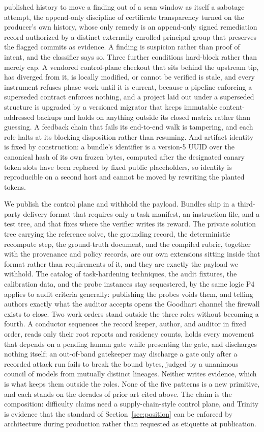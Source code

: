 \documentclass[11pt]{article}
\begin{document}
published history to move a finding out of a scan window as itself a sabotage attempt, the append-only discipline of certificate transparency turned on the producer's own history, whose only remedy is an append-only signed remediation record authorized by a distinct externally enrolled principal group that preserves the flagged commits as evidence. A finding is suspicion rather than proof of intent, and the classifier says so. Three further conditions hard-block rather than merely cap. A vendored control-plane checkout that sits behind the upstream tip, has diverged from it, is locally modified, or cannot be verified is stale, and every instrument refuses phase work until it is current, because a pipeline enforcing a superseded contract enforces nothing, and a project laid out under a superseded structure is upgraded by a versioned migrator that keeps immutable content-addressed backups and holds on anything outside its closed matrix rather than guessing. A feedback chain that fails its end-to-end walk is tampering, and each role halts at its blocking disposition rather than resuming. And artifact identity is fixed by construction: a bundle's identifier is a version-5 UUID over the canonical hash of its own frozen bytes, computed after the designated canary token slots have been replaced by fixed public placeholders, so identity is reproducible on a second host and cannot be moved by rewriting the planted tokens.

We publish the control plane and withhold the payload. Bundles ship in a third-party delivery format that requires only a task manifest, an instruction file, and a test tree, and that fixes where the verifier writes its reward. The private solution tree carrying the reference solve, the grounding record, the deterministic recompute step, the ground-truth document, and the compiled rubric, together with the provenance and policy records, are our own extensions sitting inside that format rather than requirements of it, and they are exactly the payload we withhold. The catalog of task-hardening techniques, the audit fixtures, the calibration data, and the probe instances stay sequestered, by the same logic P4 applies to audit criteria generally: publishing the probes voids them, and telling authors exactly what the auditor accepts opens the Goodhart channel the firewall exists to close. Two work orders stand outside the three roles without becoming a fourth. A conductor sequences the record keeper, author, and auditor in fixed order, reads only their root reports and residency counts, holds every movement that depends on a pending human gate while presenting the gate, and discharges nothing itself; an out-of-band gatekeeper may discharge a gate only after a recorded attack run fails to break the bound bytes, judged by a unanimous council of models from mutually distinct lineages. Neither writes evidence, which is what keeps them outside the roles. None of the five patterns is a new primitive, and each stands on the decades of prior art cited above. The claim is the composition: difficulty claims need a supply-chain-style control plane, and Trinity is evidence that the standard of Section~\ref{sec:position} can be enforced by architecture during production rather than requested as etiquette at publication.
\end{document}
